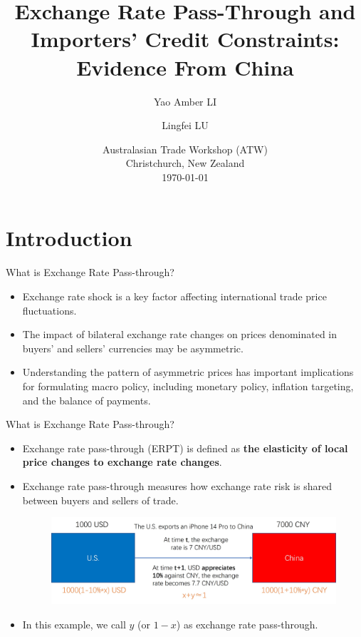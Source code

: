\documentclass[10pt]{beamer}
\title[ERPT]{Exchange Rate Pass-Through and Importers' Credit Constraints: Evidence From China}
\author[Li \& Lu]{Yao Amber LI\inst{*} \and Lingfei LU\inst{*}}
\institute[2024]{\inst{*} \small The Hong Kong University of Science and Technology}
\date{Australasian Trade Workshop (ATW) \\ \vspace{3mm} Christchurch, New Zealand \\ \vspace{4mm} \today }
\begin{document}
	
\begin{frame}
    \maketitle
    \centering
\end{frame}


\section{Introduction}

\begin{frame}{What is Exchange Rate Pass-through?}
	\begin{itemize}
		\item Exchange rate shock is a key factor affecting international trade price fluctuations.
		\item The impact of bilateral exchange rate changes on prices denominated in buyers' and sellers' currencies may be asymmetric.
		\item Understanding the pattern of asymmetric prices has important implications for formulating macro policy, including monetary policy, inflation targeting, and the balance of payments.
	\end{itemize}
\end{frame}

\begin{frame}{What is Exchange Rate Pass-through?}
	\begin{itemize}
		\item Exchange rate pass-through (ERPT) is defined as \textbf{the elasticity of local price changes to exchange rate changes}.
		\item Exchange rate pass-through measures how exchange rate risk is shared between buyers and sellers of trade.
	\begin{figure}[htbp]
		\centering
		\includegraphics[width=0.9\columnwidth]{ERPT.jpg}
		\label{ERPT}
	\end{figure}
		\item In this example, we call $y$ (or $1-x$) as exchange rate pass-through.
	\end{itemize}
\end{frame}
\end{document}

